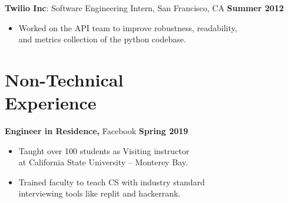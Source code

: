 \documentclass[sectioned]{dsyangres}
\begin{document}
\begin{resume}
\textbf{Twilio Inc}: Software Engineering Intern,
 San Francisco, CA \hfill \textbf{Summer 2012}
  \begin{itemize} \itemsep -2pt
    \item Worked on the API team to improve robustness, readability, \\
      and metrics collection of the python codebase.
  \end{itemize}




\section{Non-Technical \\ Experience}

\textbf{Engineer in Residence,} Facebook \hfill \textbf{Spring 2019}
  \begin{itemize} \itemsep 2pt
      \item Taught over 100 students as Visiting instructor 
        \\ at California State University -- Monterey Bay.
      \item Trained faculty to teach CS with industry standard
         \\ interviewing tools like replit and hackerrank. 
  \end{itemize}


\end{resume}
\end{document}
